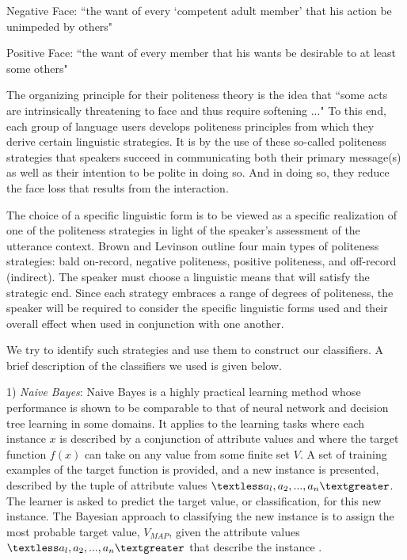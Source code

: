 \documentclass[conference]{IEEEtran}
\begin{document}
Negative Face:
``the want of every `competent adult member' that his action be unimpeded by others" 

Positive Face:
``the want of every member that his wants be desirable to at least some others"

The organizing principle for their politeness theory is the idea that ``some acts are intrinsically threatening to face and thus require softening ..." To this end, each group of language users develops politeness principles from which they derive certain linguistic strategies. It is by the use of these so-called politeness strategies that speakers succeed in communicating both their primary message(s) as well as their intention to be polite in doing so. And in doing so, they reduce the face loss that results from the interaction. 

The choice of a specific linguistic form is to be viewed as a specific realization of one of the politeness strategies in light of the speaker's assessment of the utterance context. Brown and Levinson outline four main types of politeness strategies: bald on-record, negative politeness, positive politeness, and off-record (indirect). The speaker must choose a linguistic means that will satisfy the strategic end. Since each strategy embraces a range of degrees of politeness, the speaker will be required to consider the specific linguistic forms used and their overall effect when used in conjunction with one another.

We try to identify such strategies and use them to construct our classifiers. A brief description of the classifiers we used is given below.

1) \textit{Naive Bayes}: Naive Bayes is a highly practical learning method whose performance is shown to be comparable to that of neural network and decision tree learning in some domains. It applies to the learning tasks where each instance $x$ is described by a conjunction of attribute values and where the target function $f(x)$ can take on any value from some finite set $V$. A set of training examples of the target function is provided, and a new instance is presented, described by the tuple of attribute values $\textless a_l, a_2,..., a_n\textgreater$. The learner is asked to predict the target value, or classification, for this new instance. The Bayesian approach to classifying the new instance is to assign the most probable target value, $V_{MAP}$, given the attribute values $\textless a_l, a_2,..., a_n\textgreater$ that describe the instance \cite{Mitchell}. 
\end{document}
